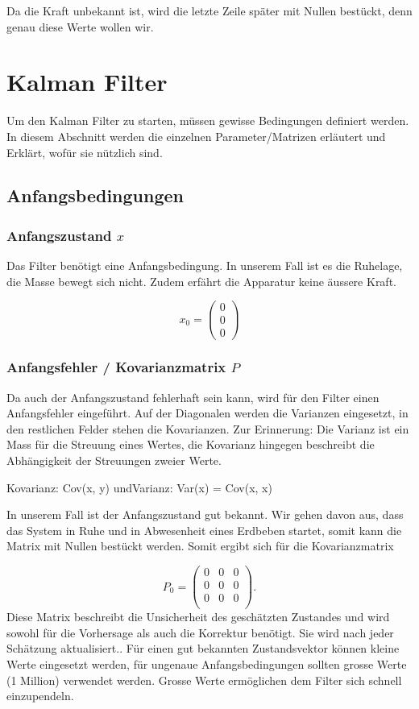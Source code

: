 Da die Kraft unbekannt ist, wird die letzte Zeile später mit Nullen bestückt, denn genau diese Werte wollen wir. 

\section{Kalman Filter}
Um den Kalman Filter zu starten, müssen gewisse Bedingungen definiert werden. In diesem Abschnitt werden die einzelnen Parameter/Matrizen erläutert und Erklärt, wofür sie nützlich sind. 


\subsection{Anfangsbedingungen}
\subsubsection*{Anfangszustand $x$}
Das Filter benötigt eine Anfangsbedingung. In unserem Fall ist es die Ruhelage, die Masse bewegt sich nicht. Zudem erfährt die Apparatur keine äussere Kraft.

\begin{equation}
{x_0 }= \left( \begin{array}{c} 0\\ 0\\ 0\end{array}\right)
\end{equation} 

\subsubsection*{Anfangsfehler / Kovarianzmatrix $P$}
Da auch der Anfangszustand fehlerhaft sein kann, wird für den Filter einen Anfangsfehler eingeführt. Auf der Diagonalen werden die Varianzen eingesetzt, in den restlichen Felder stehen die Kovarianzen.
Zur Erinnerung: Die Varianz ist ein Mass für die Streuung eines Wertes, die Kovarianz hingegen beschreibt die Abhängigkeit der Streuungen zweier Werte.

Kovarianz: Cov(x, y) undVarianz: Var(x) = Cov(x, x)

In unserem Fall ist der Anfangszustand gut bekannt. Wir gehen davon aus, dass das System in Ruhe und in Abwesenheit eines Erdbeben startet, somit kann die Matrix mit Nullen bestückt werden. Somit ergibt sich für die Kovarianzmatrix

\begin{equation}
{P_0 }=
\left(
\begin{array}{ccc} 	
0 & 0 &0 \\ 
0 &0 & 0 \\ 
0 & 0 &0 \\
\end{array}
\right).
\end{equation}
Diese Matrix beschreibt die Unsicherheit des geschätzten Zustandes und wird sowohl für die Vorhersage als auch die Korrektur benötigt. Sie wird nach jeder Schätzung aktualisiert.. Für einen gut bekannten Zustandsvektor können kleine Werte eingesetzt werden, für ungenaue Anfangsbedingungen sollten grosse Werte (1 Million) verwendet werden. Grosse Werte ermöglichen dem Filter sich schnell einzupendeln. 


